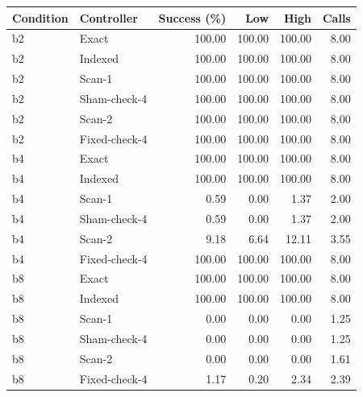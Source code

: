 \begin{longtable}{llrrrr}
\toprule
Condition & Controller & Success (\%) & Low & High & Calls\\
\midrule
\endhead
b2 & Exact & 100.00 & 100.00 & 100.00 & 8.00\\
b2 & Indexed & 100.00 & 100.00 & 100.00 & 8.00\\
b2 & Scan-1 & 100.00 & 100.00 & 100.00 & 8.00\\
b2 & Sham-check-4 & 100.00 & 100.00 & 100.00 & 8.00\\
b2 & Scan-2 & 100.00 & 100.00 & 100.00 & 8.00\\
b2 & Fixed-check-4 & 100.00 & 100.00 & 100.00 & 8.00\\
b4 & Exact & 100.00 & 100.00 & 100.00 & 8.00\\
b4 & Indexed & 100.00 & 100.00 & 100.00 & 8.00\\
b4 & Scan-1 & 0.59 & 0.00 & 1.37 & 2.00\\
b4 & Sham-check-4 & 0.59 & 0.00 & 1.37 & 2.00\\
b4 & Scan-2 & 9.18 & 6.64 & 12.11 & 3.55\\
b4 & Fixed-check-4 & 100.00 & 100.00 & 100.00 & 8.00\\
b8 & Exact & 100.00 & 100.00 & 100.00 & 8.00\\
b8 & Indexed & 100.00 & 100.00 & 100.00 & 8.00\\
b8 & Scan-1 & 0.00 & 0.00 & 0.00 & 1.25\\
b8 & Sham-check-4 & 0.00 & 0.00 & 0.00 & 1.25\\
b8 & Scan-2 & 0.00 & 0.00 & 0.00 & 1.61\\
b8 & Fixed-check-4 & 1.17 & 0.20 & 2.34 & 2.39\\
\bottomrule
\end{longtable}
